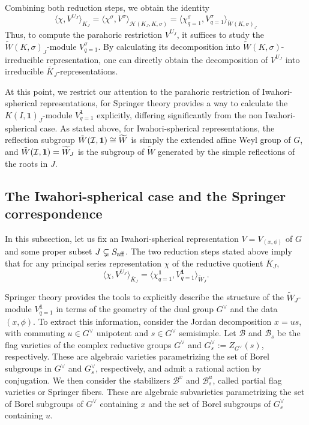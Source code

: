 Combining both reduction steps, we obtain the identity
\begin{equation}\label{eqn:reduction_steps}
    \langle\chi,V^{U_J}\rangle_{K_J}=\langle\chi^\sigma,V^\sigma\rangle_{\mathcal{H}(K_J,K,\sigma)}=\langle\chi^\sigma_{q=1},V^\sigma_{q=1}\rangle_{\tilde{W}(K,\sigma)_J}
\end{equation}
Thus, to compute the parahoric restriction $V^{U_J}$, it suffices to study the $\tilde{W}(K,\sigma)_J$-module $V_{q=1}^\sigma$. By calculating its decomposition into $\tilde{W}(K,\sigma)$-irreducible representation, one can directly obtain the decomposition of $V^{U_J}$ into irreducible $\overline{K}_J$-representations. 

At this point, we restrict our attention to the parahoric restriction of Iwahori-spherical representations, for Springer theory provides a way to calculate the $K(I,\mathbf{1})_J$-module $V^\mathbf{1}_{q=1}$ explicitly, differing significantly from the non Iwahori-spherical case. As stated above, for Iwahori-spherical representations, the reflection subgroup $\tilde{W}(\mathcal{I},\mathbf{1})\cong\widetilde{W}$ is simply the extended affine Weyl group of $G$, and $\tilde{W}(\mathcal{I},\mathbf{1})=\widetilde{W}_J$ is the subgroup of $\widetilde{W}$ generated by the simple reflections of the roots in $J$.

\subsection{The Iwahori-spherical case and the Springer correspondence}

In this subsection, let us fix an Iwahori-spherical representation $V=V_{(x,\phi)}$ of $G$ and some proper subset $J\subsetneq S_{\mathrm{aff}}$. The two reduction steps stated above imply that for any principal series representation $\chi$ of the reductive quotient $\overline{K}_J$, 
\begin{equation}\label{eqn:multiplicity_Iwahori}
    \langle\chi,V^{U_J}\rangle_{\overline{K}_J}=\langle\chi^\mathbf{1}_{q=1},V^\mathbf{1}_{q=1}\rangle_{\widetilde{W}_J}.
\end{equation}

Springer theory provides the tools to explicitly describe the structure of the $\widetilde{W}_J$-module $V^\mathbf{1}_{q=1}$ in terms of the geometry of the dual group $G^\vee$ and the data $(x,\phi)$. To extract this information, consider the Jordan decomposition $x=us$, with commuting $u\in G^\vee$ unipotent and $s\in G^\vee$ semisimple. Let $\mathcal{B}$ and $\mathcal{B}_s$ be the flag varieties of the complex reductive groups $G^\vee$ and $G^\vee_s:=Z_{G^\vee}(s)$, respectively. These are algebraic varieties parametrizing the set of Borel subgroups in $G^\vee$ and $G^\vee_s$, respectively, and admit a rational action by conjugation. We then consider the stabilizers $\mathcal{B}^x$ and $\mathcal{B}_s^u$, called partial flag varieties or Springer fibers. These are algebraic subvarieties parametrizing the set of Borel subgroups of $G^\vee$ containing $x$ and the set of Borel subgroups of $G^\vee_s$ containing $u$. 

